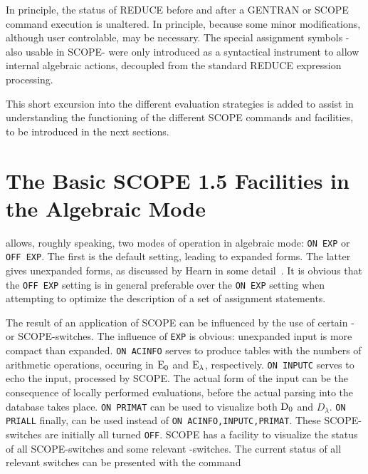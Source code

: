 In principle, the status of REDUCE before and after a GENTRAN or SCOPE
command execution is unaltered. In principle, because some minor modifications,
although user controlable, may be necessary. The special assignment symbols
 -also usable in SCOPE- were only introduced as a syntactical instrument to
allow internal algebraic actions, decoupled from the standard REDUCE
expression processing.

This short excursion into the different evaluation strategies is added to
assist in understanding the functioning of the different SCOPE commands and
facilities, to be introduced in the next sections.
\newpage

\section{The Basic SCOPE 1.5 Facilities in the Algebraic Mode}\label{SCOPE:basic}

{\REDUCE} allows, roughly speaking, two modes of operation in algebraic
mode: {\tt ON EXP} or {\tt OFF EXP}.
The first is the default setting, leading to
expanded forms.  The latter gives unexpanded forms, as discussed by Hearn
in some detail~\cite{Hearn:85,Hearn:86}.  It is obvious that the {\tt OFF
EXP} setting is in general preferable over the {\tt ON
EXP} setting when attempting to optimize the description of a set of
assignment statements.


The result of an application of SCOPE can be influenced by the use of
certain {\REDUCE}- or SCOPE-switches. The influence of {\tt EXP} is obvious:
unexpanded input is more compact than expanded.
{\tt ON ACINFO} serves to produce tables with the numbers of arithmetic
operations, oc\-cu\-ring in ${{{\rm E}}_0}$ and ${{\rm E}}_{\lambda}$,
respectively.
{\tt ON INPUTC} serves to echo the input, processed by SCOPE. The actual
form of the input can be the consequence of locally performed evaluations,
before the actual parsing into the database takes place.
{\tt ON  PRIMAT} can be used to visualize
both ${{\rm D}}_{0}$ and $D_{\lambda}$.
{\tt ON  PRIALL} finally, can be used instead of
{\tt ON ACINFO,INPUTC,PRIMAT}. These SCOPE-switches are initially all turned
{\tt OFF}. SCOPE has a facility to visualize the status of all
SCOPE-switches and some relevant {\REDUCE}-switches. The current status
of all relevant switches can be presented with the command

